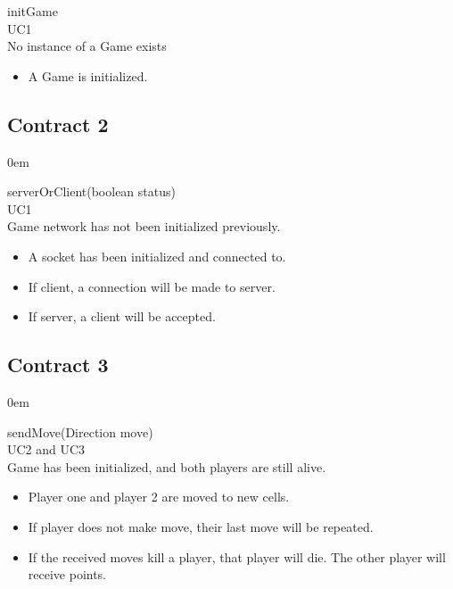 \documentclass[titlepage]{article}
\begin{document}
	\textbf{} initGame\\
	\textbf{} UC1\\
	\textbf{} No instance of a Game exists\\
		\textbf{} 
				\begin{itemize} 
				\item A Game is initialized.
				\end{itemize}
		
	\subsection{Contract 2}
	\itemsep0em 
	
	\textbf{} serverOrClient(boolean status)\\
	\textbf{} UC1\\
	\textbf{} Game network has not been initialized previously.\\
	\textbf{}
		\begin{itemize} 
			\item A socket has been initialized and connected to.
			\item If client, a connection will be made to server.
			\item If server, a client will be accepted.
		\end{itemize}
	
	\subsection{Contract 3}
	\itemsep0em 
	
	\textbf{} sendMove(Direction move)\\
	\textbf{} UC2 and UC3\\
	\textbf{} Game has been initialized, and both players are still alive.\\
	\textbf{ }
	\begin{itemize} 
		\item Player one and player 2 are moved to new cells.
		\item If player does not make move, their last move will be repeated.
		\item If the received moves kill a player, that player will die. The other player will receive points.
	\end{itemize}
	
\end{document}
